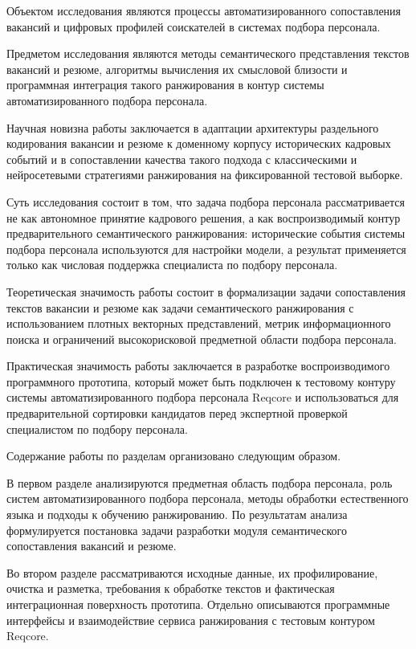 Объектом исследования являются процессы автоматизированного сопоставления вакансий и цифровых профилей соискателей в системах подбора персонала.\par
Предметом исследования являются методы семантического представления текстов вакансий и резюме, алгоритмы вычисления их смысловой близости и программная интеграция такого ранжирования в контур системы автоматизированного подбора персонала.\par
Научная новизна работы заключается в адаптации архитектуры раздельного кодирования вакансии и резюме к доменному корпусу исторических кадровых событий и в сопоставлении качества такого подхода с классическими и нейросетевыми стратегиями ранжирования на фиксированной тестовой выборке.\par
Суть исследования состоит в том, что задача подбора персонала рассматривается не как автономное принятие кадрового решения, а как воспроизводимый контур предварительного семантического ранжирования: исторические события системы подбора персонала используются для настройки модели, а результат применяется только как числовая поддержка специалиста по подбору персонала.\par
Теоретическая значимость работы состоит в формализации задачи сопоставления текстов вакансии и резюме как задачи семантического ранжирования с использованием плотных векторных представлений, метрик информационного поиска и ограничений высокорисковой предметной области подбора персонала.\par
Практическая значимость работы заключается в разработке воспроизводимого программного прототипа, который может быть подключен к тестовому контуру системы автоматизированного подбора персонала Reqcore и использоваться для предварительной сортировки кандидатов перед экспертной проверкой специалистом по подбору персонала.\par
Содержание работы по разделам организовано следующим образом.\par
В первом разделе анализируются предметная область подбора персонала, роль систем автоматизированного подбора персонала, методы обработки естественного языка и подходы к обучению ранжированию. По результатам анализа формулируется постановка задачи разработки модуля семантического сопоставления вакансий и резюме.\par
Во втором разделе рассматриваются исходные данные, их профилирование, очистка и разметка, требования к обработке текстов и фактическая интеграционная поверхность прототипа. Отдельно описываются программные интерфейсы и взаимодействие сервиса ранжирования с тестовым контуром Reqcore.\par
